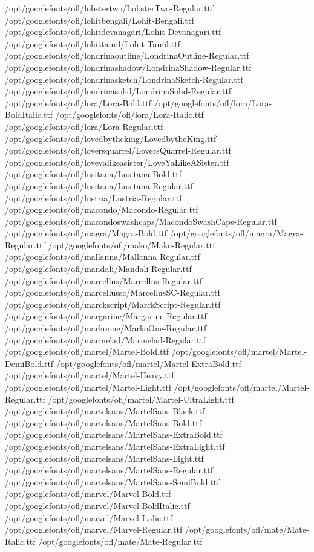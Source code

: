 /opt/googlefonts/ofl/lobstertwo/LobsterTwo-Regular.ttf
/opt/googlefonts/ofl/lohitbengali/Lohit-Bengali.ttf
/opt/googlefonts/ofl/lohitdevanagari/Lohit-Devanagari.ttf
/opt/googlefonts/ofl/lohittamil/Lohit-Tamil.ttf
/opt/googlefonts/ofl/londrinaoutline/LondrinaOutline-Regular.ttf
/opt/googlefonts/ofl/londrinashadow/LondrinaShadow-Regular.ttf
/opt/googlefonts/ofl/londrinasketch/LondrinaSketch-Regular.ttf
/opt/googlefonts/ofl/londrinasolid/LondrinaSolid-Regular.ttf
/opt/googlefonts/ofl/lora/Lora-Bold.ttf
/opt/googlefonts/ofl/lora/Lora-BoldItalic.ttf
/opt/googlefonts/ofl/lora/Lora-Italic.ttf
/opt/googlefonts/ofl/lora/Lora-Regular.ttf
/opt/googlefonts/ofl/lovedbytheking/LovedbytheKing.ttf
/opt/googlefonts/ofl/loversquarrel/LoversQuarrel-Regular.ttf
/opt/googlefonts/ofl/loveyalikeasister/LoveYaLikeASister.ttf
/opt/googlefonts/ofl/lusitana/Lusitana-Bold.ttf
/opt/googlefonts/ofl/lusitana/Lusitana-Regular.ttf
/opt/googlefonts/ofl/lustria/Lustria-Regular.ttf
/opt/googlefonts/ofl/macondo/Macondo-Regular.ttf
/opt/googlefonts/ofl/macondoswashcaps/MacondoSwashCaps-Regular.ttf
/opt/googlefonts/ofl/magra/Magra-Bold.ttf
/opt/googlefonts/ofl/magra/Magra-Regular.ttf
/opt/googlefonts/ofl/mako/Mako-Regular.ttf
/opt/googlefonts/ofl/mallanna/Mallanna-Regular.ttf
/opt/googlefonts/ofl/mandali/Mandali-Regular.ttf
/opt/googlefonts/ofl/marcellus/Marcellus-Regular.ttf
/opt/googlefonts/ofl/marcellussc/MarcellusSC-Regular.ttf
/opt/googlefonts/ofl/marckscript/MarckScript-Regular.ttf
/opt/googlefonts/ofl/margarine/Margarine-Regular.ttf
/opt/googlefonts/ofl/markoone/MarkoOne-Regular.ttf
/opt/googlefonts/ofl/marmelad/Marmelad-Regular.ttf
/opt/googlefonts/ofl/martel/Martel-Bold.ttf
/opt/googlefonts/ofl/martel/Martel-DemiBold.ttf
/opt/googlefonts/ofl/martel/Martel-ExtraBold.ttf
/opt/googlefonts/ofl/martel/Martel-Heavy.ttf
/opt/googlefonts/ofl/martel/Martel-Light.ttf
/opt/googlefonts/ofl/martel/Martel-Regular.ttf
/opt/googlefonts/ofl/martel/Martel-UltraLight.ttf
/opt/googlefonts/ofl/martelsans/MartelSans-Black.ttf
/opt/googlefonts/ofl/martelsans/MartelSans-Bold.ttf
/opt/googlefonts/ofl/martelsans/MartelSans-ExtraBold.ttf
/opt/googlefonts/ofl/martelsans/MartelSans-ExtraLight.ttf
/opt/googlefonts/ofl/martelsans/MartelSans-Light.ttf
/opt/googlefonts/ofl/martelsans/MartelSans-Regular.ttf
/opt/googlefonts/ofl/martelsans/MartelSans-SemiBold.ttf
/opt/googlefonts/ofl/marvel/Marvel-Bold.ttf
/opt/googlefonts/ofl/marvel/Marvel-BoldItalic.ttf
/opt/googlefonts/ofl/marvel/Marvel-Italic.ttf
/opt/googlefonts/ofl/marvel/Marvel-Regular.ttf
/opt/googlefonts/ofl/mate/Mate-Italic.ttf
/opt/googlefonts/ofl/mate/Mate-Regular.ttf
